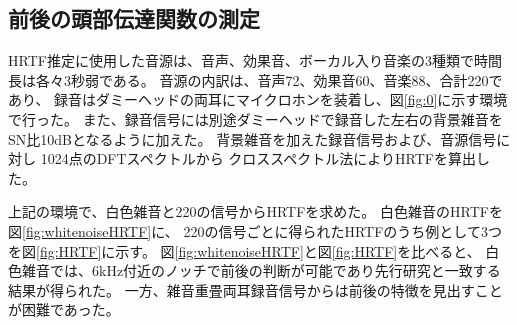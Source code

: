 \documentclass[autodetect-engine,dvi=dvipdfmx,ja=standard,twocolumn,jbase=13.35Q]{bxjsarticle}
\begin{document}

\subsection{前後の頭部伝達関数の測定}
HRTF推定に使用した音源は、音声、効果音、ボーカル入り音楽の3種類で時間長は各々3秒弱である。
音源の内訳は、音声72、効果音60、音楽88、合計220であり、
録音はダミーヘッドの両耳にマイクロホンを装着し、図\ref{fig:0}に示す環境で行った。
また、録音信号には別途ダミーヘッドで録音した左右の背景雑音をSN比10dBとなるように加えた。
背景雑音を加えた録音信号および、音源信号に対し
1024点のDFTスペクトルから
クロススペクトル法によりHRTFを算出した。

上記の環境で、白色雑音と220の信号からHRTFを求めた。
白色雑音のHRTFを図\ref{fig:whitenoiseHRTF}に、
220の信号ごとに得られたHRTFのうち例として3つを図\ref{fig:HRTF}に示す。
図\ref{fig:whitenoiseHRTF}と図\ref{fig:HRTF}を比べると、
白色雑音では、6kHz付近のノッチで前後の判断が可能であり先行研究\cite{K}と一致する結果が得られた。
一方、雑音重畳両耳録音信号からは前後の特徴を見出すことが困難であった。
\end{document}
